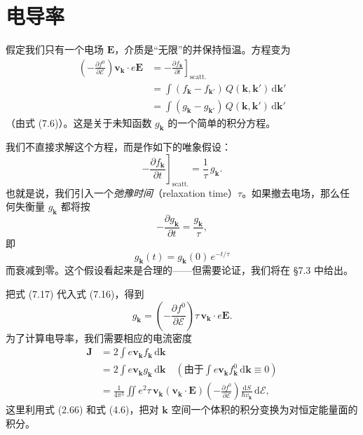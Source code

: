 \section{电导率}

假定我们只有一个电场 $\mathbf{E}$，介质是“无限”的并保持恒温。方程变为
\begin{align*}
\left(-\frac{\partial f^{0}}{\partial\mathcal{E}}\right)\mathbf{v}_{\mathbf{k}}\cdot e\mathbf{E}
&=-\left.\frac{\partial f_{\mathbf{k}}}{\partial t}\right]_{\text{scatt.}}\\
&=\int(f_{\mathbf{k}}-f_{\mathbf{k}'})\,Q(\mathbf{k},\mathbf{k}')\,\mathrm{d}\mathbf{k}'\\
&=\int(g_{\mathbf{k}}-g_{\mathbf{k}'})\,Q(\mathbf{k},\mathbf{k}')\,\mathrm{d}\mathbf{k}'\tag{7.16}
\end{align*}
（由式 (7.6)）。这是关于未知函数 $g_{\mathbf{k}}$ 的一个简单的积分方程。

我们不直接求解这个方程，而是作如下的唯象假设：
\begin{equation*}
-\left.\frac{\partial f_{\mathbf{k}}}{\partial t}\right]_{\text{scatt.}}=\frac{1}{\tau}\,g_{\mathbf{k}}.\tag{7.17}
\end{equation*}
也就是说，我们引入一个\emph{弛豫时间}（relaxation time）$\tau$。如果撤去电场，那么任何失衡量 $g_{\mathbf{k}}$ 都将按
\begin{equation*}
-\frac{\partial g_{\mathbf{k}}}{\partial t}=\frac{g_{\mathbf{k}}}{\tau},
\end{equation*}
即
\begin{equation*}
g_{\mathbf{k}}(t)=g_{\mathbf{k}}(0)\,e^{-t/\tau}\tag{7.18}
\end{equation*}
而衰减到零。这个假设看起来是合理的——但需要论证，我们将在 §7.3 中给出。

把式 (7.17) 代入式 (7.16)，得到
\begin{equation*}
g_{\mathbf{k}}=\left(-\frac{\partial f^{0}}{\partial\mathcal{E}}\right)\tau\,\mathbf{v}_{\mathbf{k}}\cdot e\mathbf{E}.\tag{7.19}
\end{equation*}
为了计算电导率，我们需要相应的电流密度
\begin{align*}
\mathbf{J}&=2\int e\mathbf{v}_{\mathbf{k}}f_{\mathbf{k}}\,\mathrm{d}\mathbf{k}\\
&=2\int e\mathbf{v}_{\mathbf{k}}g_{\mathbf{k}}\,\mathrm{d}\mathbf{k}\quad\left(\text{由于}\int e\mathbf{v}_{\mathbf{k}}f_{\mathbf{k}}^{0}\,\mathrm{d}\mathbf{k}\equiv 0\right)\\
&=\frac{1}{4\pi^{3}}\iint e^{2}\tau\,\mathbf{v}_{\mathbf{k}}(\mathbf{v}_{\mathbf{k}}\cdot\mathbf{E})\left(-\frac{\partial f^{0}}{\partial\mathcal{E}}\right)\frac{\mathrm{d}S}{\hbar v_{\mathbf{k}}}\,\mathrm{d}\mathcal{E},\tag{7.20}
\end{align*}
这里利用式 (2.66) 和式 (4.6)，把对 $\mathbf{k}$ 空间一个体积的积分变换为对恒定能量面的积分。

